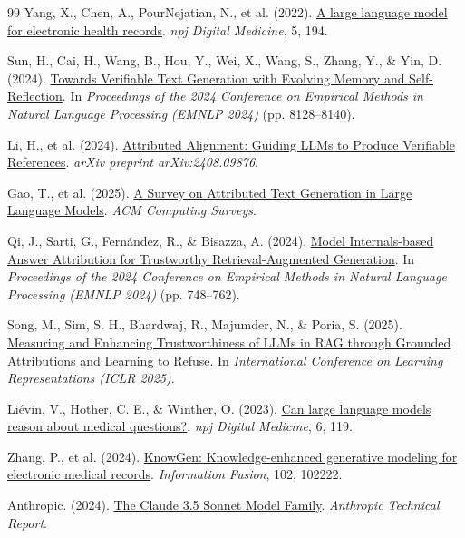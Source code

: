 \begin{thebibliography}{99}
Yang, X., Chen, A., PourNejatian, N., et al. (2022).
\href{https://doi.org/10.1038/s41746-022-00742-2}{A large language model for electronic health records}.
\textit{npj Digital Medicine}, 5, 194.

Sun, H., Cai, H., Wang, B., Hou, Y., Wei, X., Wang, S., Zhang, Y., \& Yin, D. (2024).
\href{https://arxiv.org/abs/2312.09075}{Towards Verifiable Text Generation with Evolving Memory and Self-Reflection}.
In \textit{Proceedings of the 2024 Conference on Empirical Methods in Natural Language Processing (EMNLP 2024)} (pp. 8128--8140).

Li, H., et al. (2024).
\href{https://arxiv.org/abs/2408.09876}{Attributed Alignment: Guiding LLMs to Produce Verifiable References}.
\textit{arXiv preprint arXiv:2408.09876}.

Gao, T., et al. (2025).
\href{https://arxiv.org/abs/2501.05432}{A Survey on Attributed Text Generation in Large Language Models}.
\textit{ACM Computing Surveys}.

Qi, J., Sarti, G., Fernández, R., \& Bisazza, A. (2024).
\href{https://arxiv.org/abs/2406.13663}{Model Internals-based Answer Attribution for Trustworthy Retrieval-Augmented Generation}.
In \textit{Proceedings of the 2024 Conference on Empirical Methods in Natural Language Processing (EMNLP 2024)} (pp. 748--762).

Song, M., Sim, S. H., Bhardwaj, R., Majumder, N., \& Poria, S. (2025).
\href{https://arxiv.org/abs/2409.11242}{Measuring and Enhancing Trustworthiness of LLMs in RAG through Grounded Attributions and Learning to Refuse}.
In \textit{International Conference on Learning Representations (ICLR 2025)}.

Liévin, V., Hother, C. E., \& Winther, O. (2023).
\href{https://doi.org/10.1038/s41746-023-00962-9}{Can large language models reason about medical questions?}.
\textit{npj Digital Medicine}, 6, 119.

Zhang, P., et al. (2024).
\href{https://doi.org/10.1016/j.inffus.2024.102222}{KnowGen: Knowledge-enhanced generative modeling for electronic medical records}.
\textit{Information Fusion}, 102, 102222.

Anthropic. (2024).
\href{https://www.anthropic.com/news/claude-3-5-sonnet}{The Claude 3.5 Sonnet Model Family}.
\textit{Anthropic Technical Report}.


\end{thebibliography}
